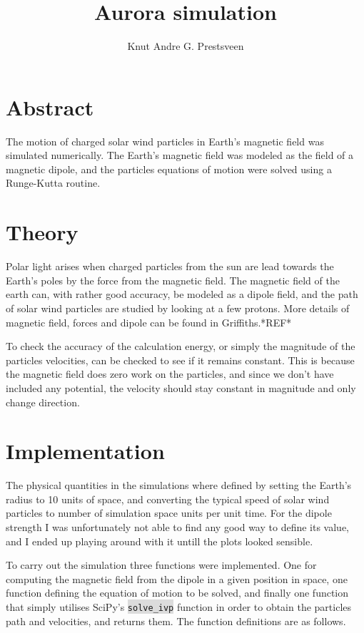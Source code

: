 \documentclass{article}
\title{Aurora simulation}
\author{Knut Andre G. Prestsveen}
\begin{document}
\maketitle
\section{Abstract}
The motion of charged solar wind particles in Earth's magnetic field was simulated numerically. The Earth's magnetic field was modeled as the field of a magnetic dipole, and the particles equations of motion were solved using a Runge-Kutta routine.

\section{Theory}
\label{theory}
Polar light arises when charged particles from the sun are lead towards the Earth's poles by the force from the magnetic field. The magnetic field of the earth can, with rather good accuracy, be modeled as a dipole field, and the path of solar wind particles are studied by looking at a few protons. More details of magnetic field, forces and dipole can be found in Griffiths.*REF*

To check the accuracy of the calculation energy, or simply the magnitude of the particles velocities, can be checked to see if it remains constant. This is because the magnetic field does zero work on the particles, and since we don't have included any potential, the velocity should stay constant in magnitude and only change direction.

\section{Implementation}
The physical quantities in the simulations where defined by setting the Earth's radius to 10 units of space, and converting the typical speed of solar wind particles to number of simulation space units per unit time. For the dipole strength I was unfortunately not able to find any good way to define its value, and I ended up playing around with it untill the plots looked sensible.

To carry out the simulation three functions were implemented. One for computing the magnetic field from the dipole in a given position in space, one function defining the equation of motion to be solved, and finally one function that simply utilises SciPy's \colorbox{gainsboro}{\lstinline{solve_ivp}} function in order to obtain the particles path and velocities, and returns them. The function definitions are as follows.
\end{document}
